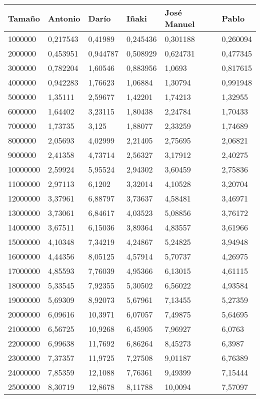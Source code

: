 \begin{tabular}{|l|l|l|l|l|l|}
	\hline
	Tamaño & Antonio & Darío & Iñaki & José Manuel & Pablo \\
	\hline
	\hline
	1000000 & 0,217543 & 0,41989 & 0,245436 & 0,301188 & 0,260094 \\
	\hline
	2000000 & 0,453951 & 0,944787 & 0,508929 & 0,624731 & 0,477345 \\
	\hline
	3000000 & 0,782204 & 1,60546 & 0,883956 & 1,0693 & 0,817615 \\
	\hline
	4000000 & 0,942283 & 1,76623 & 1,06884 & 1,30794 & 0,991948 \\
	\hline
	5000000 & 1,35111 & 2,59677 & 1,42201 & 1,74213 & 1,32955 \\
	\hline
	6000000 & 1,64402 & 3,23115 & 1,80438 & 2,24784 & 1,70433 \\
	\hline
	7000000 & 1,73735 & 3,125 & 1,88077 & 2,33259 & 1,74689 \\
	\hline
	8000000 & 2,05693 & 4,02999 & 2,21405 & 2,75695 & 2,06821 \\
	\hline
	9000000 & 2,41358 & 4,73714 & 2,56327 & 3,17912 & 2,40275 \\
	\hline
	10000000 & 2,59924 & 5,95524 & 2,94302 & 3,60459 & 2,75836 \\
	\hline
	11000000 & 2,97113 & 6,1202 & 3,32014 & 4,10528 & 3,20704 \\
	\hline
	12000000 & 3,37961 & 6,88797 & 3,73637 & 4,58481 & 3,46971 \\
	\hline
	13000000 & 3,73061 & 6,84617 & 4,03523 & 5,08856 & 3,76172 \\
	\hline
	14000000 & 3,67511 & 6,15036 & 3,89364 & 4,83557 & 3,61966 \\
	\hline
	15000000 & 4,10348 & 7,34219 & 4,24867 & 5,24825 & 3,94948 \\
	\hline
	16000000 & 4,44356 & 8,05125 & 4,57914 & 5,70737 & 4,26975 \\
	\hline
	17000000 & 4,85593 & 7,76039 & 4,95366 & 6,13015 & 4,61115 \\
	\hline
	18000000 & 5,33545 & 7,92355 & 5,30502 & 6,56022 & 4,93584 \\
	\hline
	19000000 & 5,69309 & 8,92073 & 5,67961 & 7,13455 & 5,27359 \\
	\hline
	20000000 & 6,09616 & 10,3971 & 6,07057 & 7,49875 & 5,64695 \\
	\hline
	21000000 & 6,56725 & 10,9268 & 6,45905 & 7,96927 & 6,0763 \\
	\hline
	22000000 & 6,99638 & 11,7692 & 6,86264 & 8,45273 & 6,3987 \\
	\hline
	23000000 & 7,37357 & 11,9725 & 7,27508 & 9,01187 & 6,76389 \\
	\hline
	24000000 & 7,85359 & 12,1088 & 7,76361 & 9,49399 & 7,15444 \\
	\hline
	25000000 & 8,30719 & 12,8678 & 8,11788 & 10,0094 & 7,57097 \\
	\hline
\end{tabular}

